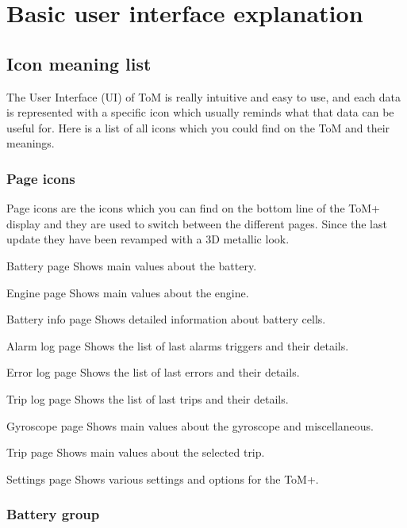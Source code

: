 \chapter{Basic user interface explanation}

\section{Icon meaning list}
\label{sec:icon_list}

The User Interface (UI) of ToM is really intuitive and easy to use, and each data is
represented with a specific icon which usually reminds what that data can be useful
for. Here is a list of all icons which you could find on the ToM and their meanings.

\subsection{Page icons}
\label{sec:page_icon_list}

Page icons are the icons which you can find on the bottom line of the ToM+ display
and they are used to switch between the different pages. Since the last update they
have been revamped with a 3D metallic look.

{Battery page}
{Shows main values about the battery.}

{Engine page}
{Shows main values about the engine.}

{Battery info page}
{Shows detailed information about battery cells.}

{Alarm log page}
{Shows the list of last alarms triggers and their details.}

{Error log page}
{Shows the list of last errors and their details.}

{Trip log page}
{Shows the list of last trips and their details.}

{Gyroscope page}
{Shows main values about the gyroscope and miscellaneous.}

{Trip page}
{Shows main values about the selected trip.}

{Settings page}
{Shows various settings and options for the ToM+.}

\subsection{Battery group}
\label{sec:item_numbers}


